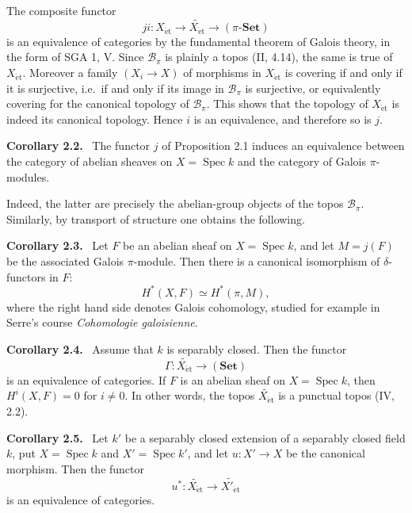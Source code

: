 \documentclass[11pt]{article}
\newcommand{\Bb}{\mathcal{B}}
\newcommand{\Spec}{\operatorname{Spec}}
\newcommand{\et}{\mathrm{\acute{e}t}}
\newcommand{\ie}{i.e.\ }
\newcommand{\SGA}{SGA}
\newenvironment{statement}[1]{\par\medskip\noindent\textbf{#1.}\ }{\par\medskip}
\begin{document}
The composite functor
\[
ji:X_{\et}\longrightarrow \widetilde{X_{\et}}\longrightarrow (\pi\text{-}\mathbf{Set})
\]
is an equivalence of categories by the fundamental theorem of Galois theory, in the form of \SGA{} 1, V. Since \(\Bb_\pi\) is plainly a topos (II, 4.14), the same is true of \(X_{\et}\). Moreover a family \((X_i\to X)\) of morphisms in \(X_{\et}\) is covering if and only if it is surjective, \ie if and only if its image in \(\Bb_\pi\) is surjective, or equivalently covering for the canonical topology of \(\Bb_\pi\). This shows that the topology of \(X_{\et}\) is indeed its canonical topology. Hence \(i\) is an equivalence, and therefore so is \(j\).

\begin{statement}{Corollary 2.2}
The functor \(j\) of Proposition 2.1 induces an equivalence between the category of abelian sheaves on \(X=\Spec k\) and the category of Galois \(\pi\)-modules.
\end{statement}

Indeed, the latter are precisely the abelian-group objects of the topos \(\Bb_\pi\). Similarly, by transport of structure one obtains the following.

\begin{statement}{Corollary 2.3}
Let \(F\) be an abelian sheaf on \(X=\Spec k\), and let \(M=j(F)\) be the associated Galois \(\pi\)-module. Then there is a canonical isomorphism of \(\delta\)-functors in \(F\):
\[
H^*(X,F)\simeq H^*(\pi,M),
\]
where the right hand side denotes Galois cohomology, studied for example in Serre's course \emph{Cohomologie galoisienne}.
\end{statement}

\begin{statement}{Corollary 2.4}
Assume that \(k\) is separably closed. Then the functor
\[
\Gamma:\widetilde{X_{\et}}\longrightarrow (\mathbf{Set})
\]
is an equivalence of categories. If \(F\) is an abelian sheaf on \(X=\Spec k\), then \(H^i(X,F)=0\) for \(i\ne 0\). In other words, the topos \(\widetilde{X_{\et}}\) is a punctual topos (IV, 2.2).
\end{statement}

\begin{statement}{Corollary 2.5}
Let \(k'\) be a separably closed extension of a separably closed field \(k\), put \(X=\Spec k\) and \(X'=\Spec k'\), and let \(u:X'\to X\) be the canonical morphism. Then the functor
\[
u^*:\widetilde{X_{\et}}\longrightarrow \widetilde{X'_{\et}}
\]
is an equivalence of categories.
\end{statement}
\end{document}
